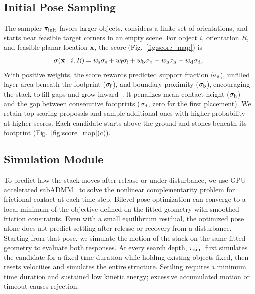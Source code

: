 \subsection{Initial Pose Sampling}\label{sec:initial_pose_sampling}
The sampler $\pi_\text{init}$ favors larger objects, considers a finite set of orientations, and starts near feasible target corners in an empty scene.
For object $i$, orientation $R$, and feasible planar location $\mathbf{x}$, the score (Fig.~\ref{fig:score_map}) is
\begin{equation*}
  \sigma(\mathbf{x}\mid i,R)
  =w_\text{s}\sigma_\text{s}+w_\text{f}\sigma_\text{f}
   +w_\text{b}\sigma_\text{b}-w_\text{h}\sigma_\text{h}-w_\text{d}\sigma_\text{d},
\end{equation*}
With positive weights, the score rewards predicted support fraction ($\sigma_\mathrm{s}$), unfilled layer area beneath the footprint ($\sigma_\mathrm{f}$), and boundary proximity ($\sigma_\mathrm{b}$), encouraging the stack to fill gaps and grow inward~\cite{menezes2021rocks}. It penalizes mean contact height ($\sigma_\mathrm{h}$) and the gap between consecutive footprints ($\sigma_\mathrm{d}$, zero for the first placement).
We retain top-scoring proposals and sample additional ones with higher probability at higher scores. Each candidate starts above the ground and stones beneath its footprint (Fig.~\ref{fig:score_map}(c)).

\subsection{Simulation Module}\label{sec:simulation}
To predict how the stack moves after release or under disturbance, we use GPU-accelerated subADMM~\cite{ji2025gpu} to solve the nonlinear complementarity problem for frictional contact at each time step.
Bilevel pose optimization can converge to a local minimum of the objective defined on the fitted geometry with smoothed friction constraints. Even with a small equilibrium residual, the optimized pose alone does not predict settling after release or recovery from a disturbance. Starting from that pose, we simulate the motion of the stack on the same fitted geometry to evaluate both responses.
At every search depth, $\pi_\text{sim}$ first simulates the candidate for a fixed time duration while holding existing objects fixed, then resets velocities and simulates the entire structure.
Settling requires a minimum time duration and sustained low kinetic energy; excessive accumulated motion or timeout causes rejection.

